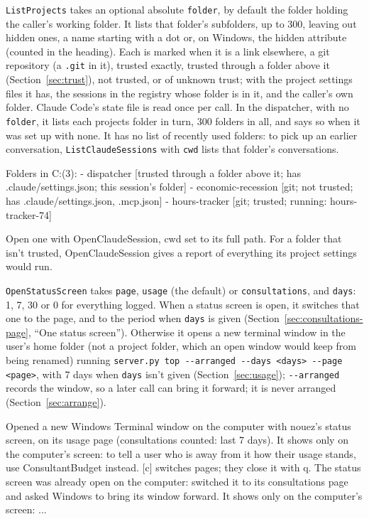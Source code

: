 \documentclass[10pt,a4paper]{article}
\newcommand{\code}[1]{\texttt{#1}}
\begin{document}
\code{ListProjects} takes an optional absolute \code{folder}, by default the folder holding the
caller's working folder. It lists that folder's subfolders, up to 300, leaving out hidden ones, a name starting
with a dot or, on Windows, the hidden attribute (counted in the heading). Each is marked when it is a link elsewhere, a git repository (a
\code{.git} in it), trusted exactly, trusted through a folder above it (Section~\ref{sec:trust}),
not trusted, or of unknown trust; with the project settings files it has, the sessions in the
registry whose folder is in it, and the caller's own folder. Claude Code's state file is read once
per call. In the dispatcher, with no \code{folder}, it lists each projects folder in turn, 300 folders in
all, and says so when it was set up with none. It has no list of recently used folders: to pick up
an earlier conversation, \code{ListClaudeSessions} with \code{cwd} lists that folder's conversations.
\begin{plain}
Folders in C:\Users\me\Projects (3):
- dispatcher [trusted through a folder above it; has .claude/settings.json; this session's folder]
- economic-recession [git; not trusted; has .claude/settings.json, .mcp.json]
- hours-tracker [git; trusted; running: hours-tracker-74]

Open one with OpenClaudeSession, cwd set to its full path. For a folder that isn't trusted, OpenClaudeSession gives a report of everything its project settings would run.
\end{plain}

\code{OpenStatusScreen} takes \code{page}, \code{usage} (the default) or \code{consultations}, and
\code{days}: 1, 7, 30 or 0 for everything logged. When a status screen is open, it switches that one
to the page, and to the period when \code{days} is given (Section~\ref{sec:consultations-page}, ``One
status screen''). Otherwise it opens a new terminal window in the user's home folder (not a project
folder, which an open window would keep from being renamed) running \code{server.py top -{}-arranged
-{}-days <days> -{}-page <page>}, with 7 days when \code{days} isn't given (Section~\ref{sec:usage});
\code{-{}-arranged} records the window, so a later call can bring it forward; it is never
arranged (Section~\ref{sec:arrange}).
\begin{plain}
Opened a new Windows Terminal window on the computer with nouez's status screen, on its usage page (consultations counted: last 7 days). It shows only on the computer's screen: to tell a user who is away from it how their usage stands, use ConsultantBudget instead. [c] switches pages; they close it with q.
The status screen was already open on the computer: switched it to its consultations page and asked Windows to bring its window forward. It shows only on the computer's screen: ...
\end{plain}
\end{document}
